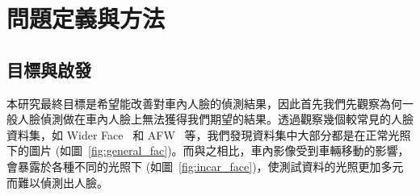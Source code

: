 \chapter{問題定義與方法}
\label{c:method}

\section{目標與啟發}

本研究最終目標是希望能改善對車內人臉的偵測結果，因此首先我們先觀察為何一般人臉偵測做在車內人臉上無法獲得我們期望的結果。透過觀察幾個較常見的人臉資料集，如 Wider Face~\cite{yang2016wider} 和 AFW~\cite{zhu2012face} 等，我們發現資料集中大部分都是在正常光照下的圖片 (如圖~\ref{fig:general_fac})。而與之相比，車內影像受到車輛移動的影響，會暴露於各種不同的光照下 (如圖~\ref{fig:incar_face})，使測試資料的光照更加多元而難以偵測出人臉。

